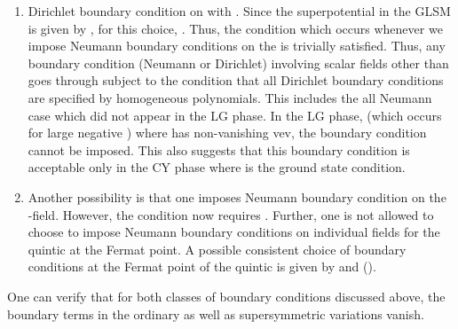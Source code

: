 \documentclass[a4paper,12pt]{article}
\begin{document}
\begin{enumerate}
\item Dirichlet boundary condition on \coordHE{} with \coordHE{}. Since the
superpotential in the GLSM is given by \coordHE{}, for this choice,
\coordHE{}.
Thus, the condition \coordHE{} which occurs whenever we impose Neumann
boundary conditions on the \coordHE{} 
is trivially satisfied. Thus, any boundary
condition (Neumann or Dirichlet) involving 
scalar fields other than \coordHE{} goes through subject to
the condition that all Dirichlet boundary conditions
are specified by homogeneous polynomials.
This includes the all Neumann case which did not
appear in the LG phase. In the LG phase,
(which occurs for large negative \coordHE{}) where \coordHE{} has non-vanishing vev,
the boundary condition \coordHE{} cannot be imposed. 
This also suggests that this boundary condition is acceptable 
only in the  CY phase where \coordHE{} is the ground state condition.
\item Another possibility is that one imposes Neumann boundary
condition on the \coordHE{}-field. 
However, the \coordHE{} condition now requires \coordHE{}.
Further, one is not allowed to choose to impose Neumann boundary
conditions on individual fields for the quintic at the Fermat point.
A possible consistent choice of boundary conditions at the Fermat point
of the quintic is given by \coordHE{}
and \coordHE{} (\coordHE{}). 
\end{enumerate}
One can verify that for both classes of boundary conditions discussed
above, the boundary terms in the ordinary as well as supersymmetric 
variations vanish. 


\subsubsection{\coordHE{}}
\end{document}
